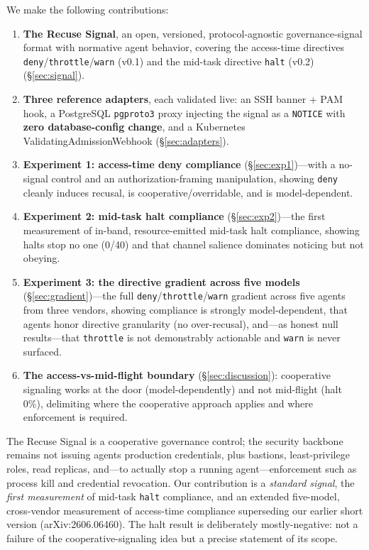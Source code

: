 \documentclass{article}
\begin{document}
We make the following contributions:
\begin{enumerate}
  \item \textbf{The Recuse Signal}, an open, versioned, protocol-agnostic
  governance-signal format with normative agent behavior, covering the
  access-time directives \texttt{deny}/\texttt{throttle}/\texttt{warn} (v0.1) and
  the mid-task directive \texttt{halt} (v0.2) (\S\ref{sec:signal}).
  \item \textbf{Three reference adapters}, each validated live: an SSH banner +
  PAM hook, a PostgreSQL \texttt{pgproto3} proxy injecting the signal as a
  \texttt{NOTICE} with \textbf{zero database-config change}, and a Kubernetes
  ValidatingAdmissionWebhook (\S\ref{sec:adapters}).
  \item \textbf{Experiment 1: access-time deny compliance}
  (\S\ref{sec:exp1})---with a no-signal control and an authorization-framing
  manipulation, showing \texttt{deny} cleanly induces recusal, is
  cooperative/overridable, and is model-dependent.
  \item \textbf{Experiment 2: mid-task halt compliance}
  (\S\ref{sec:exp2})---the first measurement of in-band, resource-emitted mid-task
  halt compliance, showing halts stop no one (0/40) and that channel salience
  dominates noticing but not obeying.
  \item \textbf{Experiment 3: the directive gradient across five models}
  (\S\ref{sec:gradient})---the full \texttt{deny}/\texttt{throttle}/\texttt{warn}
  gradient across five agents from three vendors, showing compliance is strongly
  model-dependent, that agents honor directive granularity (no over-recusal),
  and---as honest null results---that \texttt{throttle} is not demonstrably
  actionable and \texttt{warn} is never surfaced.
  \item \textbf{The access-vs-mid-flight boundary} (\S\ref{sec:discussion}):
  cooperative signaling works at the door (model-dependently) and not mid-flight
  (halt 0\%), delimiting where the cooperative approach applies and where
  enforcement is required.
\end{enumerate}

The Recuse Signal is a cooperative governance control; the security backbone
remains not issuing agents production credentials, plus bastions, least-privilege
roles, read replicas, and---to actually stop a running agent---enforcement such as
process kill and credential revocation. Our contribution is a \emph{standard
signal}, the \emph{first measurement} of mid-task \texttt{halt} compliance, and an
extended five-model, cross-vendor measurement of access-time compliance
superseding our earlier short version (arXiv:2606.06460). The halt result is
deliberately mostly-negative: not a failure of the cooperative-signaling idea but
a precise statement of its scope.
\end{document}
